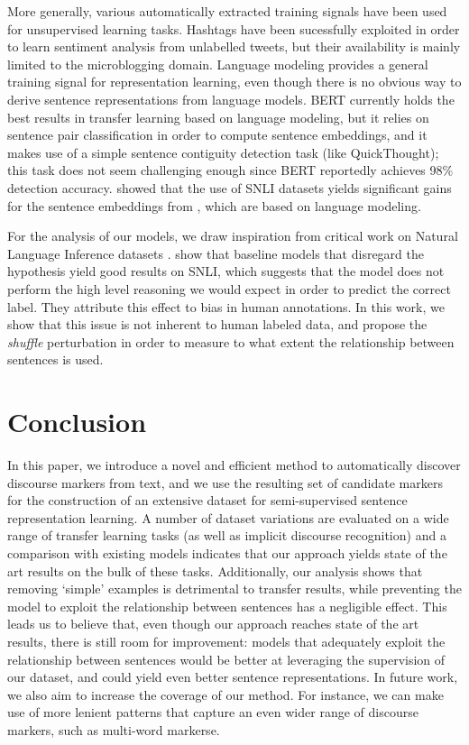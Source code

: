 \documentclass[11pt,a4paper]{article}
\begin{document}
More generally, various automatically extracted training signals have been used for unsupervised learning tasks. Hashtags \citep{Felbo2017UsingMO} have been sucessfully exploited in order to learn sentiment analysis from unlabelled tweets, but their availability is mainly limited to the microblogging domain.
Language modeling provides a general training signal for representation learning, even though there is no obvious way to derive sentence representations from language models. BERT \citep{devlin2018bert} currently holds the best results in transfer learning based on language modeling, but it relies on sentence pair classification in order to compute sentence embeddings, and it makes use of a simple sentence contiguity detection task (like QuickThought); this task does not seem challenging enough since BERT reportedly achieves 98\% detection accuracy. \citet{PhangSTILTS} showed that the use of SNLI datasets yields significant gains for the sentence embeddings from \citet{Radford2018ImprovingLU}, which are based on language modeling.

For the analysis of our models, we draw inspiration from critical work on Natural Language Inference datasets \citep{Dasgupta2018, Levy2018}.  
\citet{Gururangan2018,Poliak2018} show that baseline models that disregard the hypothesis yield good results on SNLI, which suggests that the model does not perform the high level reasoning we would expect in order to predict the correct label. They attribute this effect to bias in human annotations. In this work, we show that this issue is not inherent to human labeled data, and propose the \textit{shuffle} perturbation in order to measure to what extent the relationship between sentences is used.


\section{Conclusion}
In this paper, we introduce a novel and efficient method to automatically discover discourse markers from text, and we use the resulting set of candidate markers for the construction of an extensive dataset for semi-supervised sentence representation learning. A number of dataset variations are evaluated on a wide range of transfer learning tasks (as well as implicit discourse recognition) and a comparison with existing models indicates that our approach yields state of the art results on the bulk of these tasks. Additionally, our analysis shows that removing `simple' examples is detrimental to transfer results, while preventing the model to exploit the relationship between sentences has a negligible effect. This leads us to believe that, even though our approach reaches state of the art results, there is still room for improvement: models that adequately exploit the relationship between sentences would be better at leveraging the supervision of our dataset, and could yield even better sentence representations.
In future work, we also aim to increase the coverage of our method. For instance, we can make use of more lenient patterns that capture an even wider range of discourse markers, such as multi-word markerse. 









\end{document}
